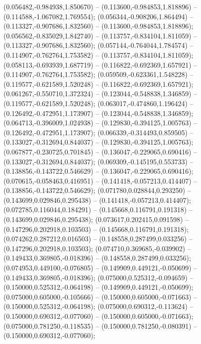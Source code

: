  (0.056482,-0.984938,1.850670) -- (0.113600,-0.984853,1.818896) -- (0.114588,-1.067082,1.769554);
 (0.056344,-0.908206,1.864494) -- (0.113327,-0.907686,1.832560) -- (0.113600,-0.984853,1.818896);
 (0.056562,-0.835029,1.842740) -- (0.113757,-0.834104,1.811059) -- (0.113327,-0.907686,1.832560);
 (0.057144,-0.764044,1.784574) -- (0.114907,-0.762764,1.753582) -- (0.113757,-0.834104,1.811059);
 (0.058113,-0.693939,1.687719) -- (0.116822,-0.692369,1.657921) -- (0.114907,-0.762764,1.753582);
 (0.059509,-0.623361,1.548228) -- (0.119577,-0.621589,1.520248) -- (0.116822,-0.692369,1.657921);
 (0.061267,-0.550710,1.372324) -- (0.123044,-0.548838,1.346859) -- (0.119577,-0.621589,1.520248);
 (0.063017,-0.474860,1.196424) -- (0.126492,-0.472951,1.173907) -- (0.123044,-0.548838,1.346859);
 (0.064713,-0.396009,1.024938) -- (0.129830,-0.394125,1.005763) -- (0.126492,-0.472951,1.173907);
 (0.066339,-0.314493,0.859505) -- (0.133027,-0.312694,0.844037) -- (0.129830,-0.394125,1.005763);
 (0.067877,-0.230725,0.701845) -- (0.136047,-0.229065,0.690416) -- (0.133027,-0.312694,0.844037);
 (0.069309,-0.145195,0.553733) -- (0.138856,-0.143722,0.546629) -- (0.136047,-0.229065,0.690416);
 (0.070615,-0.058463,0.416951) -- (0.141418,-0.057213,0.414407) -- (0.138856,-0.143722,0.546629);
 (0.071780,0.028844,0.293250) -- (0.143699,0.029846,0.295438) -- (0.141418,-0.057213,0.414407);
 (0.072785,0.116044,0.184291) -- (0.145668,0.116791,0.191318) -- (0.143699,0.029846,0.295438);
 (0.073617,0.202415,0.091598) -- (0.147296,0.202918,0.103503) -- (0.145668,0.116791,0.191318);
 (0.074262,0.287212,0.016503) -- (0.148558,0.287499,0.033256) -- (0.147296,0.202918,0.103503);
 (0.074710,0.369685,-0.039902) -- (0.149433,0.369805,-0.018396) -- (0.148558,0.287499,0.033256);
 (0.074953,0.449100,-0.076805) -- (0.149909,0.449121,-0.050699) -- (0.149433,0.369805,-0.018396);
 (0.075000,0.525312,-0.094659) -- (0.150000,0.525312,-0.064198) -- (0.149909,0.449121,-0.050699);
 (0.075000,0.605000,-0.105666) -- (0.150000,0.605000,-0.071663) -- (0.150000,0.525312,-0.064198);
 (0.075000,0.690312,-0.113624) -- (0.150000,0.690312,-0.077060) -- (0.150000,0.605000,-0.071663);
 (0.075000,0.781250,-0.118535) -- (0.150000,0.781250,-0.080391) -- (0.150000,0.690312,-0.077060);
